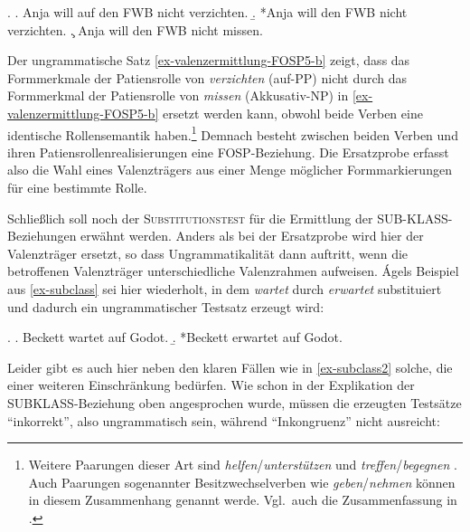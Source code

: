 \ex. \label{ex-valenzermittlung-FOSP5}
\a. Anja will auf den FWB nicht verzichten.\label{ex-valenzermittlung-FOSP5-a}
\b. *Anja will den FWB nicht verzichten.\label{ex-valenzermittlung-FOSP5-b}
\c. Anja will den FWB nicht missen.\label{ex-valenzermittlung-FOSP5-c}

Der ungrammatische Satz \ref{ex-valenzermittlung-FOSP5-b} zeigt, dass das Formmerkmale der Patiensrolle von {\it verzichten} (auf-PP) nicht durch das Formmerkmal der Patiensrolle von {\it missen} (Akkusativ-NP) in \ref{ex-valenzermittlung-FOSP5-b}  ersetzt werden kann, obwohl beide Verben eine identische Rollensemantik haben.\footnote{Weitere Paarungen dieser Art sind {\it helfen}/{\it unterstützen} \citep[402]{Mueller:10} und {\it treffen}/{\it begegnen} \citep[126]{Pollard:Sag:87}. Auch Paarungen sogenannter Besitzwechselverben wie {\it geben}/{\it nehmen} \citep[Kapitel~7]{Kunze:91} können in diesem Zusammenhang genannt werde. Vgl.\ auch die Zusammenfassung in \citet[Abschnitt~11.11.5]{Mueller:10}.} Demnach besteht zwischen beiden Verben und ihren Patiensrollenrealisierungen eine FOSP-Beziehung. Die Ersatzprobe erfasst also die Wahl eines Valenzträgers aus einer Menge möglicher Formmarkierungen für eine bestimmte Rolle.  %



\label{par-subsitutionstest} Schlie\ss lich soll noch der \textsc{Substitutionstest} für die Ermittlung der SUB-\linebreak KLASS-Beziehun\-gen erwähnt werden. Anders als bei der Ersatzprobe wird hier der Valenzträger ersetzt, so dass Ungrammatikalität dann auftritt, wenn die betroffenen Valenzträger unterschiedliche Valenzrahmen aufweisen. \'Agels Beispiel aus \ref{ex-subclass} sei hier wiederholt, in dem {\it wartet} durch {\it erwartet} substituiert und dadurch ein ungrammatischer Testsatz erzeugt wird: 

\ex. \label{ex-subclass2}
\a. Beckett wartet auf Godot.
\b. *Beckett erwartet auf Godot.

Leider gibt es auch hier neben den klaren Fällen wie in \ref{ex-subclass2} solche, die einer weiteren Einschränkung bedürfen. Wie schon in der Explikation der SUBKLASS-Beziehung oben angesprochen wurde, müssen die erzeugten Testsätze "`inkorrekt"', also ungrammatisch sein, während "`Inkongruenz"' nicht ausreicht:


